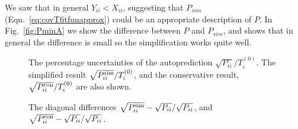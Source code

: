 We saw that in general $Y_{ii} < X_{ii}$, suggesting that $P_{sim}$ (Eqn.~\ref{eq:covTfitfunapprox}) could be an appropriate description of $P$. In Fig.~\ref{fig:PminA} we show the difference between $P$ and $P_{sim}$, and shows that in general the difference is small so the simplification works quite well. 
 \begin{figure}[H]
    \begin{center}
    \end{center}
  \vspace{-0.55cm}
  \caption{The percentage uncertainties of the autoprediction $\sqrt{P_{ii}}/T^{(0)}_i$. The simplified result $\sqrt{P^{\rm sim}_{ii}}/T^{(0)}_i$, and the conservative result, $\sqrt{P^{\rm con}_{ii}}/T^{(0)}_i$ are also shown.}
  \label{fig:Pdiag}
\end{figure}
 \begin{figure}[H]
    \begin{center}
    \end{center}
  \vspace{-0.55cm}
  \caption{The diagonal differences $\sqrt{P^{\rm sim}_{ii}}-\sqrt{P_{ii}}/\sqrt{P_{ii}}$, and $\sqrt{P^{\rm con}_{ii}}-\sqrt{P_{ii}}/\sqrt{P_{ii}}$. }
  \label{fig:Pdiagapprox}
\end{figure}
